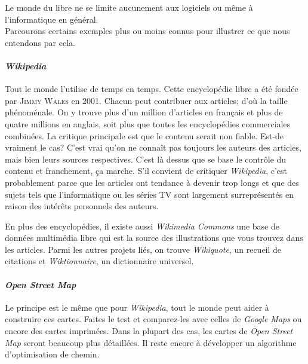 \documentclass[10pt]{../fiche}
\begin{document}

Le monde du libre ne se limite aucunement aux logiciels ou même à l'informatique en général.\\
Parcourons certains exemples plus ou moins connus pour illustrer ce que nous entendons par cela.

\paragraph{\textit{Wikipedia}}
Tout le monde l'utilise de temps en temps. Cette encyclopédie libre a été fondée par \textsc{Jimmy Wales} en 2001.
Chacun peut contribuer aux articles; d'où la taille phénoménale.
On y trouve plus d'un million d'articles en français et plus de quatre millions en anglais, soit plus que toutes les encyclopédies commerciales combinées.
La critique principale est que le contenu serait non fiable.
Est-de vraiment le cas? C'est vrai qu'on ne connaît pas toujours les auteurs des articles, mais bien leurs sources respectives.
C'est là dessus que se base le contrôle du contenu et franchement, ça marche.
S'il convient de critiquer \textit{Wikipedia}, c'est probablement parce que les articles ont tendance à devenir trop longs et que des sujets tels que l'informatique ou les séries TV
sont largement surreprésentés en raison des intérêts personnels des auteurs.

En plus des encyclopédies, il existe aussi \textit{Wikimedia Commons} une base de données multimédia libre
qui est la source des illustrations que vous trouvez dans les articles.
Parmi les autres projets liés, on trouve \textit{Wikiquote}, un recueil de citations et \textit{Wiktionnaire}, un dictionnaire universel.

\paragraph{\textit{Open Street Map}}
Le principe est le même que pour \textit{Wikipedia}, tout le monde peut aider à construire ces cartes.
Faites le test et comparez-les avec celles de \textit{Google Maps} ou encore des cartes imprimées.
Dans la plupart des cas, les cartes de \textit{Open Street Map} seront beaucoup plus détaillées.
Il reste encore à développer un algorithme d'optimisation de chemin.
\end{document}
